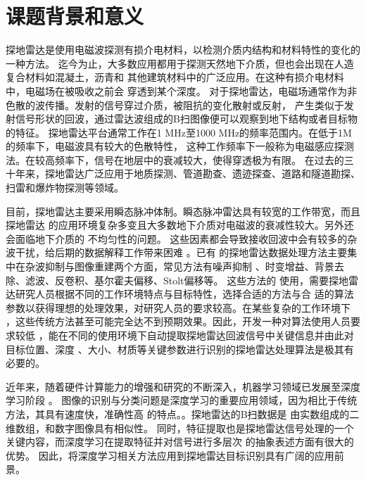 \thesischapterexordium

\section{课题背景和意义}

探地雷达是使用电磁波探测有损介电材料，以检测介质内结构和材料特性的变化的一种方法。
迄今为止，大多数应用都用于探测天然地下介质，但也会出现在人造复合材料如混凝土，沥青和
其他建筑材料中的广泛应用。在这种有损介电材料中，电磁场在被吸收之前会
穿透到某个深度。
对于探地雷达，电磁场通常作为非色散的波传播。发射的信号穿过介质，被阻抗的变化散射或反射，
产生类似于发射信号形状的回波，通过雷达波组成的B扫图像便可以观察到地下结构或者目标物的特征。
探地雷达平台通常工作在1 MHz至1000 MHz的频率范围内。在低于1M的频率下，电磁波具有较大的色散特性，
这种工作频率下一般称为电磁感应探测法。在较高频率下，信号在地层中的衰减较大，使得穿透极为有限。
在过去的三十年来，探地雷达广泛应用于地质探测、管道勘查、遗迹探查、道路和隧道勘探、
扫雷和爆炸物探测等领域。

目前，探地雷达主要采用瞬态脉冲体制。瞬态脉冲雷达具有较宽的工作带宽，而且探地雷达
的应用环境复杂多变且大多数地下介质对电磁波的衰减性较大。另外还会面临地下介质的
不均匀性的问题。
这些因素都会导致接收回波中会有较多的杂波干扰，给后期的数据解释工作带来困难
。已有
的探地雷达数据处理方法主要集中在杂波抑制与图像重建两个方面，常见方法有噪声抑制
、时变增益、背景去除、滤波、反卷积、基尔霍夫偏移、Stolt偏移等。
这些方法的
使用，需要探地雷达研究人员根据不同的工作环境特点与目标特性，选择合适的方法与合
适的算法参数以获得理想的处理效果，对研究人员的要求较高。在某些复杂的工作环境下
，这些传统方法甚至可能完全达不到预期效果。因此，开发一种对算法使用人员要求较低
，能在不同的使用环境下自动提取探地雷达回波信号中关键信息并由此对目标位置、深度
、大小、材质等关键参数进行识别的探地雷达处理算法是极其有必要的。

近年来，随着硬件计算能力的增强和研究的不断深入，机器学习领域已发展至深度学习阶段
。
图像的识别与分类问题是深度学习的重要应用领域，因为相比于传统方法，其具有速度快，准确性高
的特点。。探地雷达的B扫数据是
由实数组成的二维数组，和数字图像具有相似性。
同时，特征提取也是探地雷达信号处理的一个关键内容，而深度学习在提取特征并对信号进行多层次
的抽象表述方面有很大的优势。
因此，将深度学习相关方法应用到探地雷达目标识别具有广阔的应用前景。

